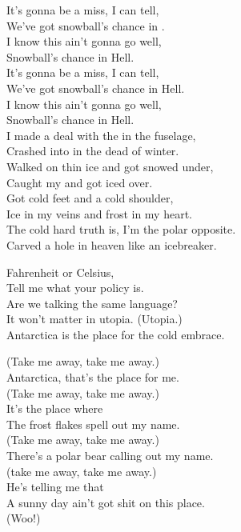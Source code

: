 
It's gonna be a miss, I can tell, \\
We've got snowball's chance in . \\
I know this ain't gonna go well, \\
Snowball's chance in Hell. \\
It's gonna be a miss, I can tell, \\
We've got snowball's chance in Hell. \\
I know this ain't gonna go well, \\
Snowball's chance in Hell. \\

I made a deal with the  in the fuselage, \\
Crashed into  in the dead of winter. \\
Walked on thin ice and got snowed under, \\
Caught my  and got iced over. \\
Got cold feet and a cold shoulder, \\
Ice in my veins and frost in my heart. \\
The cold hard truth is, I'm the polar opposite. \\
Carved a hole in heaven like an icebreaker. \\


Fahrenheit or Celsius, \\
Tell me what your policy is. \\
Are we talking the same language? \\
It won't matter in utopia. (Utopia.) \\
Antarctica is the place for the cold embrace. \\


(Take me away, take me away.) \\
Antarctica, that's the place for me. \\
(Take me away, take me away.) \\
It's the place where \\
The frost flakes spell out my name. \\

(Take me away, take me away.) \\
There's a polar bear calling out my name. \\
(take me away, take me away.) \\
He's telling me that \\
A sunny day ain't got shit on this place. \\
(Woo!)

